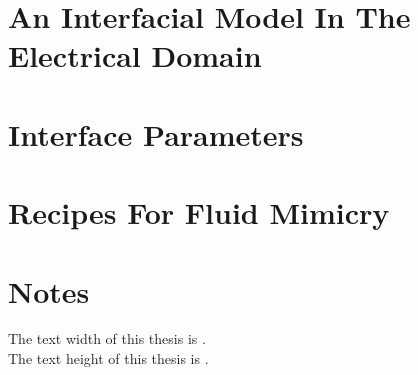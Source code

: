   \chapter{An Interfacial Model In The Electrical Domain}
    \label{chap:theInterfaceModel}
    

  \chapter{Interface Parameters}
    \label{chap:interfaceParameters}
    

  \chapter{Recipes For Fluid Mimicry}
    \label{chap:fluid_mimicry}
    

%
%
%     
%
%     
%
%     
%
%     
%

\chapter*{Notes}
The text width of this thesis is \the\textwidth.\\
The text height of this thesis is \the\textheight.





